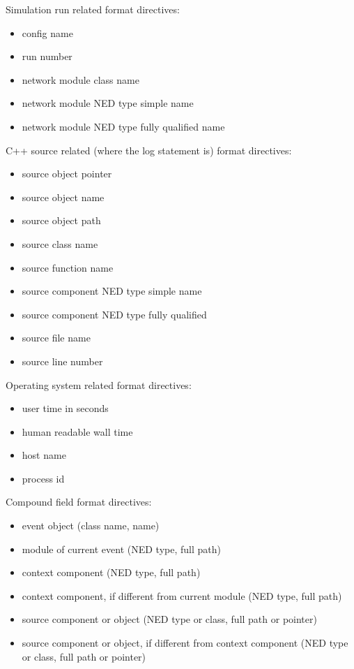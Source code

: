 Simulation run related format directives:
\begin{itemize}
  \item {} config name
  \item {} run number
  \item {} network module class name
  \item {} network module NED type simple name
  \item {} network module NED type fully qualified name
\end{itemize}

C++ source related (where the log statement is) format directives:
\begin{itemize}
  \item {} source object pointer
  \item {} source object name
  \item {} source object path
  \item {} source class name
  \item {} source function name
  \item {} source component NED type simple name
  \item {} source component NED type fully qualified
  \item {} source file name
  \item {} source line number
\end{itemize}

Operating system related format directives:
\begin{itemize}
  \item {} user time in seconds
  \item {} human readable wall time
  \item {} host name
  \item {} process id
\end{itemize}

Compound field format directives:
\begin{itemize}
  \item {} event object (class name, name)
  \item {} module of current event (NED type, full path)
  \item {} context component (NED type, full path)
  \item {} context component, if different from current module (NED type, full path)
  \item {} source component or object (NED type or class, full path or pointer)
  \item {} source component or object, if different from context component (NED type or class, full path or pointer)
\end{itemize}

